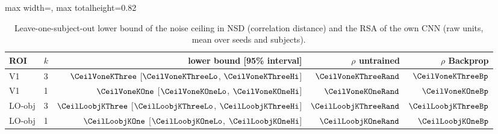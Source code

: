 \begin{table}[H]
\centering
\small
\begin{adjustbox}{max width=\textwidth, max totalheight=0.82\textheight}
\begin{tabular}{@{}llrrr@{}}
\toprule
ROI & $k$ & lower bound [95\% interval] & $\rho$ untrained & $\rho$ Backprop \\
\midrule
V1 & 3 & $\CeilVoneKThree$ [$\CeilVoneKThreeLo$, $\CeilVoneKThreeHi$] & $\CeilVoneKThreeRand$ & $\CeilVoneKThreeBp$ \\
V1 & 1 & $\CeilVoneKOne$ [$\CeilVoneKOneLo$, $\CeilVoneKOneHi$] & $\CeilVoneKOneRand$ & $\CeilVoneKOneBp$ \\
LO-obj & 3 & $\CeilLoobjKThree$ [$\CeilLoobjKThreeLo$, $\CeilLoobjKThreeHi$] & $\CeilLoobjKThreeRand$ & $\CeilLoobjKThreeBp$ \\
LO-obj & 1 & $\CeilLoobjKOne$ [$\CeilLoobjKOneLo$, $\CeilLoobjKOneHi$] & $\CeilLoobjKOneRand$ & $\CeilLoobjKOneBp$ \\
\bottomrule
\end{tabular}
\end{adjustbox}
\caption{Leave-one-subject-out lower bound of the noise ceiling in NSD (correlation distance) and the RSA of the own CNN (raw units, mean over seeds and subjects).}
\label{tab:nsdceil}
\end{table}
